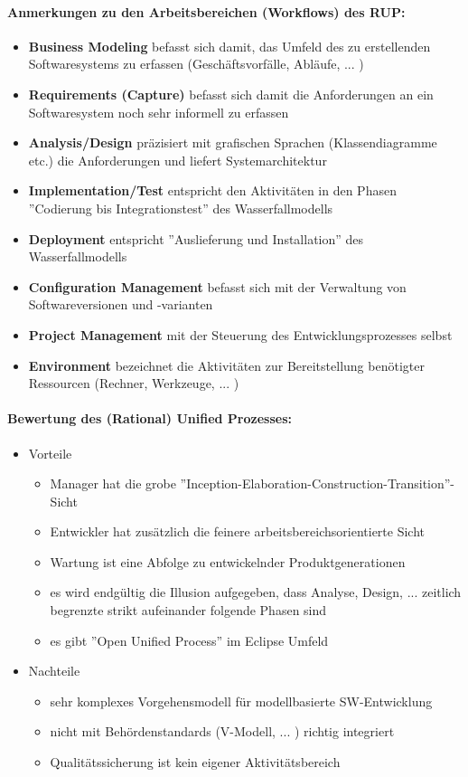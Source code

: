 \paragraph{Anmerkungen zu den Arbeitsbereichen (Workflows) des RUP:}
\begin{itemize}
	\item \textbf{Business Modeling} befasst sich damit, das Umfeld des zu erstellenden Softwaresystems zu erfassen (Geschäftsvorfälle, Abläufe, ... )
	\item \textbf{Requirements (Capture)} befasst sich damit die Anforderungen an ein Softwaresystem noch sehr informell zu erfassen
	\item \textbf{Analysis/Design} präzisiert mit grafischen Sprachen (Klassendiagramme etc.) die Anforderungen und liefert Systemarchitektur
	\item \textbf{Implementation/Test} entspricht den Aktivitäten in den Phasen ''Codierung bis Integrationstest'' des Wasserfallmodells
	\item \textbf{Deployment} entspricht ''Auslieferung und Installation'' des Wasserfallmodells
	\item \textbf{Configuration Management} befasst sich mit der Verwaltung von Softwareversionen und -varianten
	\item \textbf{Project Management} mit der Steuerung des Entwicklungsprozesses selbst
	\item \textbf{Environment} bezeichnet die Aktivitäten zur Bereitstellung benötigter Ressourcen (Rechner, Werkzeuge, ... )
\end{itemize}

\paragraph{Bewertung des (Rational) Unified Prozesses:}
\begin{itemize}
	\item Vorteile
	\begin{itemize}
		\item Manager hat die grobe ''Inception-Elaboration-Construction-Transition''-Sicht
		\item Entwickler hat zusätzlich die feinere arbeitsbereichsorientierte Sicht
		\item Wartung ist eine Abfolge zu entwickelnder Produktgenerationen
		\item es wird endgültig die Illusion aufgegeben, dass Analyse, Design, ... zeitlich begrenzte strikt aufeinander folgende Phasen sind
		\item es gibt ''Open Unified Process'' im Eclipse Umfeld
	\end{itemize}
	\item Nachteile
	\begin{itemize}
		\item sehr komplexes Vorgehensmodell für modellbasierte SW-Entwicklung
		\item nicht mit Behördenstandards (V-Modell, ... ) richtig integriert
		\item Qualitätssicherung ist kein eigener Aktivitätsbereich
	\end{itemize}
\end{itemize}


